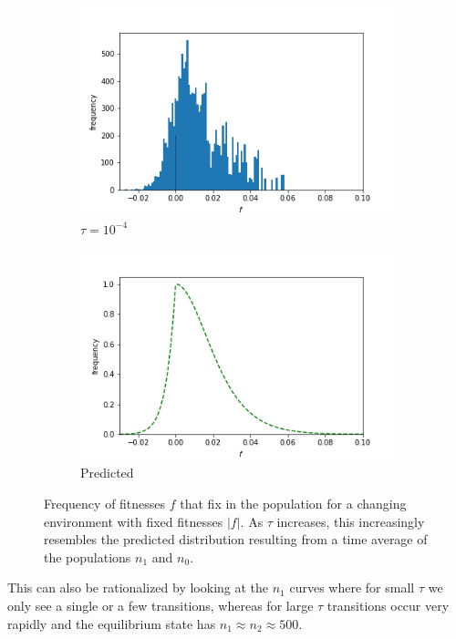 \documentclass{article}
\begin{document}
\begin{figure}[h]
\begin{subfigure}[t]{0.24\linewidth}
		\includegraphics[width = 1.0\linewidth, trim={0 0 0 0}, clip=true]{figures/tau5e3_selection_hist2.png}
		\caption{$\tau = 10^{-4}$}
		\label{fig:t4}
	\end{subfigure}
	\begin{subfigure}[t]{0.24\linewidth}
		\centering
		\includegraphics[width = 1.0\linewidth, trim={0 0 0 0}, clip=true]{figures/no_n_combined_dists.png}
		\caption{Predicted}
		\label{fig:pred}
	\end{subfigure}
\caption{Frequency of fitnesses $f$ that fix in the population for a changing environment with fixed fitnesses $|f|$. As $\tau$ increases, this increasingly resembles the predicted distribution resulting from a time average of the populations $n_1$ and $n_0$.}
\label{fig:changing_constant}
\end{figure}

This can also be rationalized by looking at the $n_1$ curves where for small $\tau$ we only see a single or a few transitions, whereas for large $\tau$ transitions occur very rapidly and the equilibrium state has $n_1 \approx n_2 \approx 500$.
\end{document}
